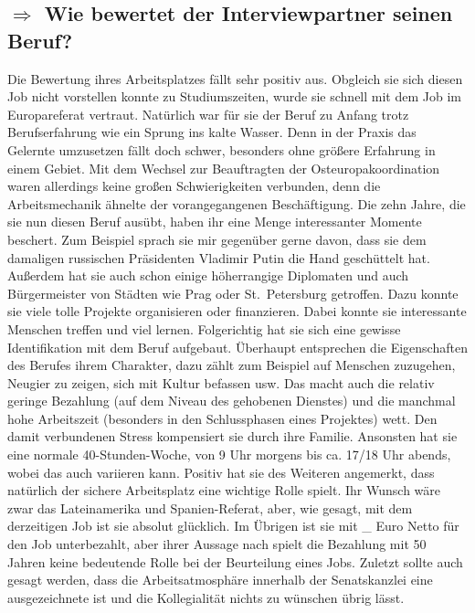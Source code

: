 \documentclass[12pt,headsepline,a4paper]{scrartcl}
\newcommand\quest[1]{\subsection*{$\Rightarrow$ #1}}
\begin{document}
\quest{Wie bewertet der Interviewpartner seinen Beruf?}
Die Bewertung ihres Arbeitsplatzes fällt sehr positiv aus. Obgleich sie sich diesen Job nicht vorstellen konnte zu Studiumszeiten, wurde sie schnell mit dem Job im Europareferat vertraut. Natürlich war für sie der Beruf zu Anfang trotz Berufserfahrung wie ein Sprung ins kalte Wasser. Denn in der Praxis das Gelernte umzusetzen fällt doch schwer, besonders ohne größere Erfahrung in einem Gebiet.
Mit dem Wechsel zur Beauftragten der Osteuropakoordination waren allerdings keine großen Schwierigkeiten verbunden, denn die Arbeitsmechanik ähnelte der vorangegangenen Beschäftigung.
Die zehn Jahre, die sie nun diesen Beruf ausübt, haben ihr eine Menge interessanter Momente beschert. Zum Beispiel sprach sie mir gegenüber gerne davon, dass sie dem damaligen russischen Präsidenten Vladimir Putin die Hand geschüttelt hat. Außerdem hat sie auch schon einige höherrangige Diplomaten  und auch Bürgermeister von Städten wie Prag oder St.\ Petersburg  getroffen.
Dazu konnte sie viele tolle Projekte organisieren oder finanzieren. Dabei konnte sie interessante Menschen treffen und viel lernen. Folgerichtig hat sie sich eine gewisse Identifikation mit dem Beruf aufgebaut.
Überhaupt entsprechen die Eigenschaften des Berufes ihrem Charakter, dazu zählt zum Beispiel auf Menschen zuzugehen, Neugier zu zeigen, sich mit Kultur befassen usw.
Das macht auch die relativ geringe Bezahlung (auf dem Niveau des gehobenen Dienstes) und die manchmal hohe Arbeitszeit (besonders in den Schlussphasen eines Projektes)  wett. Den damit verbundenen Stress kompensiert sie durch ihre Familie. Ansonsten hat sie eine  normale 40-Stunden-Woche, von 9 Uhr morgens bis ca. 17/18 Uhr abends, wobei das auch variieren kann.
Positiv hat sie des Weiteren angemerkt, dass natürlich der sichere Arbeitsplatz eine wichtige Rolle spielt.
Ihr Wunsch wäre zwar das Lateinamerika und Spanien-Referat, aber, wie gesagt, mit dem derzeitigen Job ist sie absolut glücklich. 
Im Übrigen ist sie mit \_ Euro Netto für den Job unterbezahlt, aber ihrer Aussage nach spielt die Bezahlung mit 50 Jahren keine bedeutende Rolle bei der Beurteilung eines Jobs.
Zuletzt sollte auch gesagt werden, dass die Arbeitsatmosphäre innerhalb der Senatskanzlei eine ausgezeichnete ist und die Kollegialität nichts zu wünschen übrig lässt.
\end{document}
